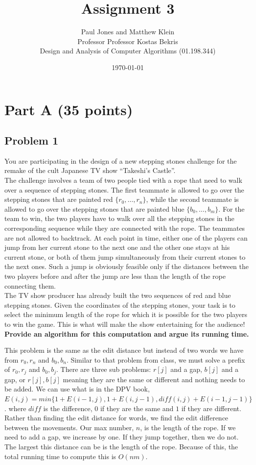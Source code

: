 \documentclass[11pt]{article}
\title{Assignment 3}
\author{Paul Jones and Matthew Klein \\
		Professor Professor Kostas Bekris\\
		Design and Analysis of Computer Algorithms (01.198.344)}
\date{\today}
\begin{document}
\pagebreak

\section*{Part A (35 points)}

\subsection*{Problem 1} You are participating in the design of a
new stepping stones challenge for the remake of the cult Japanese TV
show ``Takeshi's Castle''.\\

\noindent The challenge involves a team of two people tied with a rope
that need to walk over a sequence of stepping stones. The first
teammate is allowed to go over the stepping stones that are painted
red $\{r_0, \ldots, r_n\}$, while the second teammate is allowed to go
over the stepping stones that are painted blue $\{b_0, \ldots,
b_m\}$. For the team to win, the two players have to walk over all the
stepping stones in the corresponding sequence while they are connected
with the rope. The teammates are not allowed to backtrack. At each
point in time, either one of the players can jump from her current
stone to the next one and the other one stays at his current stone, or
both of them jump simultaneously from their current stones to the next
ones. Such a jump is obviously feasible only if the distances between
the two players before and after the jump are less than the length of
the rope connecting them.\\

\noindent The TV show producer has already built the two sequences of
red and blue stepping stones. Given the coordinates of the stepping
stones, your task is to select the minimum length of the rope for
which it is possible for the two players to win the game. This is what
will make the show entertaining for the audience!\\

\noindent \textbf{Provide an algorithm for this computation and argue its
running time.}


This problem is the same as the edit distance but instead of two words we have from $r_0,r_n$ and $b_0,b_n$. Similar to that problem from class, we must solve a prefix of $r_0,r_j$ and $b_0,b_j$. There are three sub problems: $r[j]$ and a gap, $b[j]$ and a gap, or $r[j],b[j]$ meaning they are the same or different and nothing needs to be added. We can use what is in the DPV book, $E(i,j) = min\{1+E(i-1,j), 1+E(i,j-1), diff(i,j)+E(i-1,j-1)\}$. where $diff$ is the difference, $0$ if they are the same and $1$ if they are different. Rather than finding the edit distance for words, we find the edit difference between the movements. Our max number, $n$, is the length of the rope. If we need to add a gap, we increase by one. If they jump together, then we do not. The largest this distance can be is the length of the rope. Because of this, the total running time to compute this is $O(nm)$.
\end{document}
